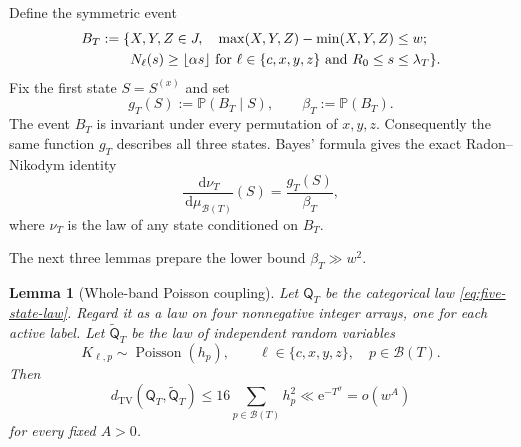 \documentclass[11pt]{article}
\numberwithin{equation}{section}
\theoremstyle{plain}
\newtheorem{lemma}[theorem]{Lemma}
\newcommand{\Pp}{\mathbb P}
\newcommand{\1}{\mathbf 1}
\newcommand{\dd}{\,\mathrm d}
\newcommand{\e}{\mathrm e}
\newcommand{\cB}{\mathcal B}
\newcommand{\TV}{\operatorname{TV}}
\begin{document}
Define the symmetric event
\begin{align}
 B_T:=\{&
 X,Y,Z\in J,\quad
 \max(X,Y,Z)-\min(X,Y,Z)\le w;\notag\\
 &N_\ell(s)\ge\lfloor\alpha s\rfloor
 \text{ for }\ell\in\{c,x,y,z\}
 \text{ and }R_0\le s\le\lambda_T\}.
                                                        \label{eq:target-event}
\end{align}
Fix the first state $S=S^{(x)}$ and set
\begin{equation}\label{eq:rooted-functions}
 g_T(S):=\Pp(B_T\mid S),
 \qquad
 \beta_T:=\Pp(B_T).
\end{equation}
The event $B_T$ is invariant under every permutation of $x,y,z$.
Consequently the same function $g_T$ describes all three states.  Bayes'
formula gives the exact Radon--Nikodym identity
\begin{equation}\label{eq:bayes-density}
 \frac{\dd\nu_T}{\dd\mu_{\cB(T)}}(S)
 =\frac{g_T(S)}{\beta_T},
\end{equation}
where $\nu_T$ is the law of any state conditioned on $B_T$.

The next three lemmas prepare the lower bound
$\beta_T\gg w^2$.

\begin{lemma}[Whole-band Poisson coupling]\label{lem:poisson-coupling}
Let $\mathsf Q_T$ be the categorical law
\eqref{eq:five-state-law}.  Regard it as a law on four nonnegative integer
arrays, one for each active label.  Let $\widetilde{\mathsf Q}_T$ be the law
of independent random variables
\[
 K_{\ell,p}\sim\operatorname{Poisson}(h_p),
 \qquad
 \ell\in\{c,x,y,z\},\quad p\in\cB(T).
\]
Then
\begin{equation}\label{eq:whole-band-tv}
 d_{\TV}(\mathsf Q_T,\widetilde{\mathsf Q}_T)
 \le16\sum_{p\in\cB(T)}h_p^2
 \ll\e^{-T^\vartheta}
 =o(w^A)
\end{equation}
for every fixed $A>0$.
\end{lemma}
\end{document}
